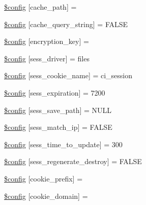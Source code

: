 \begin{DoxyCompactItemize}
\item 
\hyperlink{config_8php_a0f1391e01a3a0b76f22e6c0b5c0f47af}{\$config} \mbox{[}\textquotesingle{}cache\+\_\+path\textquotesingle{}\mbox{]} = \textquotesingle{}\textquotesingle{}
\item 
\hyperlink{config_8php_a70f4af0a439597d3d7f8be31a050867e}{\$config} \mbox{[}\textquotesingle{}cache\+\_\+query\+\_\+string\textquotesingle{}\mbox{]} = F\+A\+L\+SE
\item 
\hyperlink{config_8php_af43facf6a8ff007843b771513aa93dfe}{\$config} \mbox{[}\textquotesingle{}encryption\+\_\+key\textquotesingle{}\mbox{]} = \textquotesingle{}\textquotesingle{}
\item 
\hyperlink{config_8php_aaeca65cee3c00f9df76c74e352283c3c}{\$config} \mbox{[}\textquotesingle{}sess\+\_\+driver\textquotesingle{}\mbox{]} = \textquotesingle{}files\textquotesingle{}
\item 
\hyperlink{config_8php_a416e16954fea70dd96e9ff2134451b87}{\$config} \mbox{[}\textquotesingle{}sess\+\_\+cookie\+\_\+name\textquotesingle{}\mbox{]} = \textquotesingle{}ci\+\_\+session\textquotesingle{}
\item 
\hyperlink{config_8php_a233a1bb9ff2f169ef3cfa142121a25f7}{\$config} \mbox{[}\textquotesingle{}sess\+\_\+expiration\textquotesingle{}\mbox{]} = 7200
\item 
\hyperlink{config_8php_a3d653cf8ae8e24c6a336796f7447ccad}{\$config} \mbox{[}\textquotesingle{}sess\+\_\+save\+\_\+path\textquotesingle{}\mbox{]} = N\+U\+LL
\item 
\hyperlink{config_8php_ad61d051008d3524d24ba135bfeb1531f}{\$config} \mbox{[}\textquotesingle{}sess\+\_\+match\+\_\+ip\textquotesingle{}\mbox{]} = F\+A\+L\+SE
\item 
\hyperlink{config_8php_a2d88d1952ab601090523e0f8d4676578}{\$config} \mbox{[}\textquotesingle{}sess\+\_\+time\+\_\+to\+\_\+update\textquotesingle{}\mbox{]} = 300
\item 
\hyperlink{config_8php_a4d469f30b7e3539f5a90da887cc05be9}{\$config} \mbox{[}\textquotesingle{}sess\+\_\+regenerate\+\_\+destroy\textquotesingle{}\mbox{]} = F\+A\+L\+SE
\item 
\hyperlink{config_8php_a4a9435423f9b07e56b82b4a0d07a23d9}{\$config} \mbox{[}\textquotesingle{}cookie\+\_\+prefix\textquotesingle{}\mbox{]} = \textquotesingle{}\textquotesingle{}
\item 
\hyperlink{config_8php_a73a43940ec583de5bcdb19c239b4510c}{\$config} \mbox{[}\textquotesingle{}cookie\+\_\+domain\textquotesingle{}\mbox{]} = \textquotesingle{}\textquotesingle{}

\end{DoxyCompactItemize}
